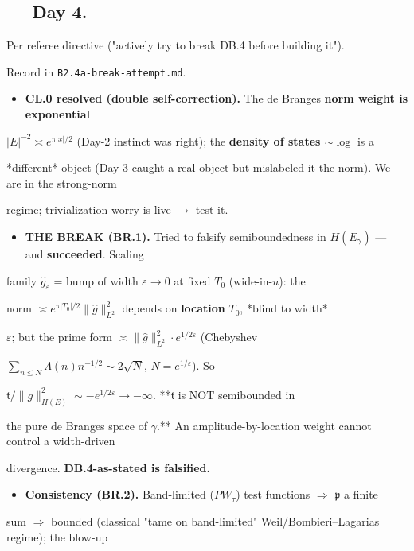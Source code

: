 \documentclass[10pt]{article}
\begin{document}
\subsection*{ --- Day 4.}
Per referee directive ("actively try to break DB.4 before building it").\par
Record in \texttt{B2.4a-break-attempt.md}.\par
\begin{itemize}
\item \textbf{CL.0 resolved (double self-correction).} The de Branges \textbf{norm weight is exponential}
\end{itemize}
  $|E|^{-2}\asymp e^{\pi|x|/2}$ (Day-2 instinct was right); the \textbf{density of states $\sim\log$} is a\par
  *different* object (Day-3 caught a real object but mislabeled it the norm). We are in the strong-norm\par
  regime; trivialization worry is live \ensuremath{\to} test it.\par
\begin{itemize}
\item \textbf{THE BREAK (BR.1).} Tried to falsify semiboundedness in $H(E_\gamma)$ --- and \textbf{succeeded}. Scaling
\end{itemize}
  family $\widehat g_\varepsilon$ = bump of width $\varepsilon\to0$ at fixed $T_0$ (wide-in-$u$): the\par
  norm $\asymp e^{\pi|T_0|/2}\|\widehat g\|_{L^2}^2$ depends on \textbf{location} $T_0$, *blind to width*\par
  $\varepsilon$; but the prime form $\asymp\|\widehat g\|_{L^2}^2\cdot e^{1/2\varepsilon}$ (Chebyshev\par
  $\sum_{n\le N}\Lambda(n)n^{-1/2}\sim2\sqrt N$, $N=e^{1/\varepsilon}$). So\par
  $\mathfrak t/\|g\|_{H(E)}^2\sim -e^{1/2\varepsilon}\to-\infty$. **$\mathfrak t$ is NOT semibounded in\par
  the pure de Branges space of $\gamma$.** An amplitude-by-location weight cannot control a width-driven\par
  divergence. \textbf{DB.4-as-stated is falsified.}\par
\begin{itemize}
\item \textbf{Consistency (BR.2).} Band-limited ($PW_\tau$) test functions $\Rightarrow$ $\mathfrak p$ a finite
\end{itemize}
  sum $\Rightarrow$ bounded (classical "tame on band-limited" Weil/Bombieri--Lagarias regime); the blow-up\par
\end{document}
